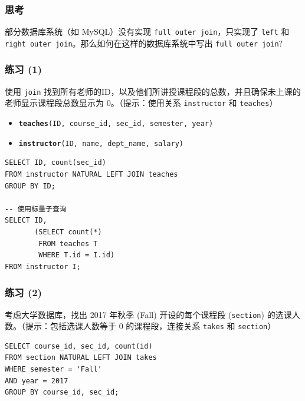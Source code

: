 \documentclass[aspectratio=169, 14pt]{beamer}
\begin{document}
\begin{frame}
    \frametitle{思考}

    {\large {}}  部分数据库系统（如 MySQL）没有实现 \texttt{full outer join}，只实现了 \texttt{left} 和 \texttt{right outer join}。那么如何在这样的数据库系统中写出 \texttt{full outer join}?

\end{frame}

\begin{frame}
    \frametitle{练习 (1)}
    {\large {}}  使用 \texttt{join} 找到所有老师的ID，以及他们所讲授课程段的总数，并且确保未上课的老师显示课程段总数显示为 0。（提示：使用关系 \texttt{instructor} 和 \texttt{teaches}）

\begin{itemize}
    \item \texttt{\textbf{teaches}(ID, course\_id, sec\_id, semester, year)}
    \item \texttt{\textbf{instructor}(ID, name, dept\_name, salary)}
\end{itemize}
    
\end{frame}

\begin{frame}[fragile]

    \begin{verbatim}
SELECT ID, count(sec_id)
FROM instructor NATURAL LEFT JOIN teaches
GROUP BY ID;

-- 使用标量子查询
SELECT ID,
       (SELECT count(*)
        FROM teaches T
        WHERE T.id = I.id)
FROM instructor I;
    \end{verbatim}
\end{frame}

\begin{frame}[fragile]
    \frametitle{练习 (2)}
    {\large {}} 
    考虑大学数据库，找出 2017 年秋季 (Fall) 开设的每个课程段 (\texttt{section}) 的选课人数。（提示：包括选课人数等于 0 的课程段，连接关系 \texttt{takes} 和 \texttt{section}）

\pause
    \begin{verbatim}
SELECT course_id, sec_id, count(id)
FROM section NATURAL LEFT JOIN takes
WHERE semester = 'Fall'
AND year = 2017
GROUP BY course_id, sec_id;
    \end{verbatim}


\end{frame}
\end{document}

